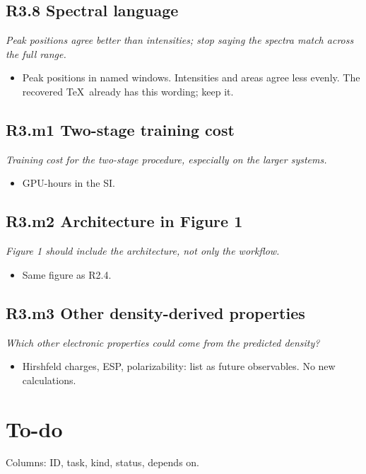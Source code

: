 \documentclass[11pt]{article}
\newcommand{\revpoint}[1]{\textit{#1}\par\nopagebreak\vspace{0.35em}}
\newcommand{\revhead}[1]{\subsection*{#1}}
\begin{document}
\revhead{R3.8 Spectral language}
\revpoint{Peak positions agree better than intensities; stop saying the spectra match across the full range.}
\begin{itemize}
  \item Peak positions in named windows. Intensities and areas agree less evenly.
        The recovered \TeX\ already has this wording; keep it.
\end{itemize}

\revhead{R3.m1 Two-stage training cost}
\revpoint{Training cost for the two-stage procedure, especially on the larger systems.}
\begin{itemize}
  \item GPU-hours in the SI.
\end{itemize}

\revhead{R3.m2 Architecture in Figure 1}
\revpoint{Figure 1 should include the architecture, not only the workflow.}
\begin{itemize}
  \item Same figure as R2.4.
\end{itemize}

\revhead{R3.m3 Other density-derived properties}
\revpoint{Which other electronic properties could come from the predicted density?}
\begin{itemize}
  \item Hirshfeld charges, ESP, polarizability: list as future observables. No new
        calculations.
\end{itemize}

\section{To-do}

\noindent
Columns: ID, task, kind, status, depends on.
\end{document}
